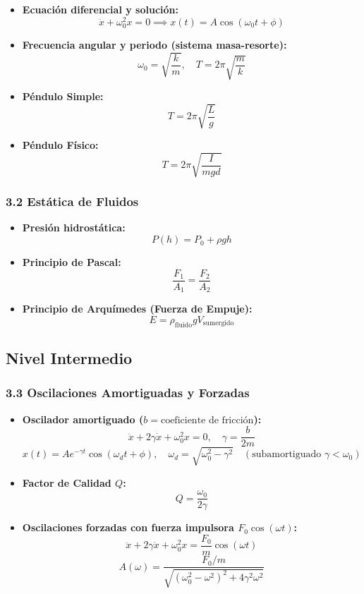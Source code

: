\documentclass[11pt,a4paper]{article}
\begin{document}
\begin{itemize}
  \item \textbf{Ecuación diferencial y solución:}
  \[
    \ddot{x} + \omega_0^2 x = 0 \implies x(t) = A \cos(\omega_0 t + \phi)
  \]
  \item \textbf{Frecuencia angular y periodo (sistema masa-resorte):}
  \[
    \omega_0 = \sqrt{\frac{k}{m}}, \quad T = 2\pi\sqrt{\frac{m}{k}}
  \]
  \item \textbf{Péndulo Simple:}
  \[
    T = 2\pi\sqrt{\frac{L}{g}}
  \]
  \item \textbf{Péndulo Físico:}
  \[
    T = 2\pi\sqrt{\frac{I}{m g d}}
  \]
\end{itemize}

\subsubsection*{3.2 Estática de Fluidos}

\begin{itemize}
  \item \textbf{Presión hidrostática:}
  \[
    P(h) = P_0 + \rho g h
  \]
  \item \textbf{Principio de Pascal:}
  \[
    \frac{F_1}{A_1} = \frac{F_2}{A_2}
  \]
  \item \textbf{Principio de Arquímedes (Fuerza de Empuje):}
  \[
    E = \rho_{\text{fluido}} g V_{\text{sumergido}}
  \]
\end{itemize}

\subsection*{Nivel Intermedio}

\subsubsection*{3.3 Oscilaciones Amortiguadas y Forzadas}

\begin{itemize}
  \item \textbf{Oscilador amortiguado ($b = \text{coeficiente de fricción}$):}
  \[
    \ddot{x} + 2\gamma \dot{x} + \omega_0^2 x = 0, \quad \gamma = \frac{b}{2m}
  \]
  \[
    x(t) = A e^{-\gamma t} \cos(\omega_d t + \phi), \quad \omega_d = \sqrt{\omega_0^2 - \gamma^2} \quad (\text{subamortiguado } \gamma < \omega_0)
  \]
  \item \textbf{Factor de Calidad $Q$:}
  \[
    Q = \frac{\omega_0}{2\gamma}
  \]
  \item \textbf{Oscilaciones forzadas con fuerza impulsora $F_0 \cos(\omega t)$:}
  \[
    \ddot{x} + 2\gamma \dot{x} + \omega_0^2 x = \frac{F_0}{m} \cos(\omega t)
  \]
  \[
    A(\omega) = \frac{F_0 / m}{\sqrt{(\omega_0^2 - \omega^2)^2 + 4\gamma^2 \omega^2}}
  \]
\end{itemize}
\end{document}
